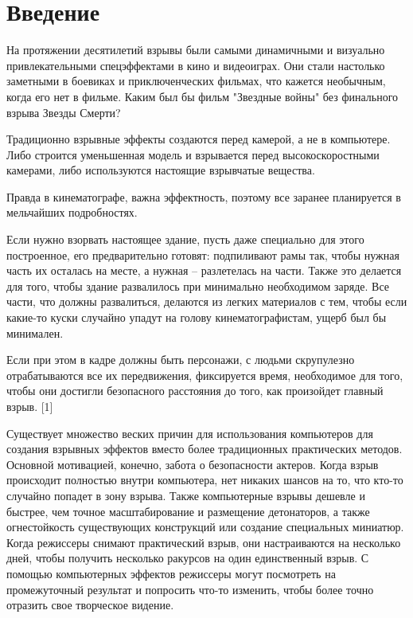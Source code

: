 \documentclass[a4paper,14pt]{article} %
\newcommand{\anonsection}[1]{\section*{#1}\addcontentsline{toc}{section}{#1}}
\begin{document}
	\begin{titlepage}
	
	\end{titlepage}
    
	\tableofcontents
	
	\newpage
    
	\anonsection{Введение}
	
	\hfill
	
	На протяжении десятилетий взрывы были самыми динамичными и визуально привлекательными спецэффектами в кино и видеоиграх. Они стали настолько заметными в боевиках и приключенческих фильмах, что кажется необычным, когда его нет в фильме. Каким был бы фильм "Звездные войны" без финального взрыва Звезды Смерти? 
	
	Традиционно взрывные эффекты создаются перед камерой, а не в компьютере. Либо строится уменьшенная модель и взрывается перед высокоскоростными камерами, либо используются настоящие взрывчатые вещества. 
	
	Правда в кинематографе, важна эффектность, поэтому все заранее планируется в мельчайших подробностях.
	
	Если нужно взорвать настоящее здание, пусть даже специально для этого построенное, его предварительно готовят: подпиливают рамы так, чтобы нужная часть их осталась на месте, а нужная – разлетелась на части. Также это делается для того, чтобы здание развалилось при минимально необходимом заряде. Все части, что должны развалиться, делаются из легких материалов с тем, чтобы если какие-то куски случайно упадут на голову кинематографистам, ущерб был бы минимален. 
	
	Если при этом в кадре должны быть персонажи, с людьми скрупулезно отрабатываются все их передвижения, фиксируется время, необходимое для того, чтобы они достигли безопасного расстояния до того, как произойдет главный взрыв. [1]
	
	Существует множество веских причин для использования компьютеров для создания взрывных эффектов вместо более традиционных практических методов. Основной мотивацией, конечно, забота о безопасности актеров. Когда взрыв происходит полностью внутри компьютера, нет никаких шансов на то, что кто-то случайно попадет в зону взрыва. Также компьютерные взрывы дешевле и быстрее, чем точное масштабирование и размещение детонаторов, а также огнестойкость существующих конструкций или создание специальных миниатюр. Когда режиссеры снимают практический взрыв, они настраиваются на несколько дней, чтобы получить несколько ракурсов на один единственный взрыв. С помощью компьютерных эффектов режиссеры могут посмотреть на промежуточный результат и попросить что-то изменить, чтобы более точно отразить свое творческое видение. 
	
\end{document}
